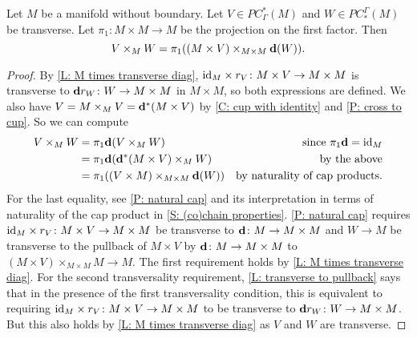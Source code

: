\begin{lemma}\label{L: diagonal version of intersection}
Let $M$ be a manifold without boundary. Let $V \in PC^*_\Gamma(M)$ and $W \in PC_*^\Gamma(M)$ be transverse. Let $\pi_1 \colon M \times M \to M$ be the projection on the first factor. Then $$V \times_M W = \pi_1((M \times V)\times_{M \times M} \mathbf{d}(W)).$$
\end{lemma}
\begin{proof}
By \cref{L: M times transverse diag}, $\mathrm{id}_M \times r_V \colon M \times V \to M \times M$ is transverse to $\mathbf{d} r_W \colon W \to M \times M$ in $M \times M$, so both expressions are defined. We also have $V = M \times_M V = \mathbf{d}^*(M \times V)$ by \cref{C: cup with identity} and \cref{P: cross to cup}.
So we can compute
\begin{align*}
V \times_M W& = \pi_1\mathbf{d} (V \times_M W)&\text{since $\pi_1\mathbf{d} = \mathrm{id}_M$}\\
& = \pi_1\mathbf{d} (\mathbf{d}^*(M \times V) \times_M W)&\text{by the above}\\
& = \pi_1((V \times M)\times_{M \times M}\mathbf{d}(W))&\text{by naturality of cap products.}
\end{align*}
For the last equality, see \cref{P: natural cap} and its interpretation in terms of naturality of the cap product in \cref{S: (co)chain properties}. \cref{P: natural cap} requires $\mathrm{id}_M \times r_V \colon M \times V \to M \times M$ be transverse to $\mathbf{d} \colon M \to M \times M$ and $W \to M$ be transverse to the pullback of $M \times V$ by $\mathbf{d} \colon M \to M \times M$ to
$(M \times V)\times_{M \times M}M \to M$.
The first requirement holds by \cref{L: M times transverse diag}. For the second transversality requirement, \cref{L: transverse to pullback} says that in the presence of the first transversality condition, this is equivalent to requiring $\mathrm{id}_M \times r_V \colon M \times V \to M \times M$ to be transverse to $\mathbf{d} r_W \colon W \to M \times M$. But this also holds by \cref{L: M times transverse diag} as $V$ and $W$ are transverse.
\end{proof}


